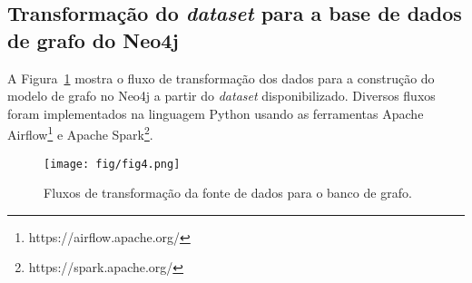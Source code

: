







\subsection{Transformação do \emph{dataset} para a base de dados de grafo do Neo4j}
\label{subsec:work}

A Figura~\ref{fig:workflow} mostra o fluxo de transformação dos dados para a construção do modelo de grafo no Neo4j a partir do \emph{dataset} disponibilizado. Diversos fluxos foram implementados na linguagem Python usando as ferramentas Apache Airflow\footnote{https://airflow.apache.org/} e Apache Spark\footnote{https://spark.apache.org/}. 

\begin{figure}
\centering
\texttt{[image: fig/fig4.png]}
\caption{Fluxos de transformação da fonte de dados para o banco de grafo.}
\label{fig:workflow}
\end{figure}


